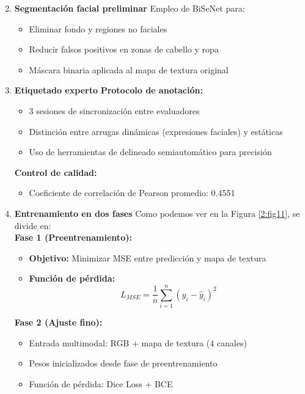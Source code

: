 \begin{enumerate}
	\setcounter{enumi}{1}
    \item \textbf{Segmentación facial preliminar}
    Empleo de BiSeNet para:
    \begin{itemize}[label=$\bullet$, leftmargin=1em]
        \item Eliminar fondo y regiones no faciales
        \item Reducir falsos positivos en zonas de cabello y ropa
        \item Máscara binaria aplicada al mapa de textura original
    \end{itemize}
    


    \item \textbf{Etiquetado experto}
    \textbf{Protocolo de anotación:}
    \begin{itemize}[label=$\bullet$, leftmargin=1em]
        \item 3 sesiones de sincronización entre evaluadores
        \item Distinción entre arrugas dinámicas (expresiones faciales) y estáticas
        \item Uso de herramientas de delineado semiautomático para precisión
    \end{itemize}
    \textbf{Control de calidad:}
    \begin{itemize}[label=$\bullet$, leftmargin=1em]
        \item Coeficiente de correlación de Pearson promedio: 0.4551
    \end{itemize}


    \item \textbf{Entrenamiento en dos fases}
    Como podemos ver en la Figura \ref{2:fig11}, se divide en:
	\\
    \textbf{Fase 1 (Preentrenamiento):}
    \begin{itemize}[label=$\bullet$, leftmargin=1em]
        \item \textbf{Objetivo:} Minimizar MSE entre predicción y mapa de textura
        \item \textbf{Función de pérdida:}
        $$
        L_{MSE} = \frac{1}{n} \sum_{i=1}^{n} (y_i - \hat{y}_i)^2
        $$
    \end{itemize}
    \textbf{Fase 2 (Ajuste fino):}
    \begin{itemize}[label=$\bullet$, leftmargin=1em]
        \item Entrada multimodal: RGB + mapa de textura (4 canales)
        \item Pesos inicializados desde fase de preentrenamiento
        \item Función de pérdida: Dice Loss + BCE
    \end{itemize}

\end{enumerate}

